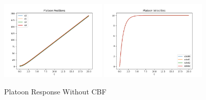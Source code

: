 \begin{figure}[H]
    \centering
    \includegraphics[width=0.45\textwidth]{Figures/Examples/Platoon/NoPositions.png}
    \includegraphics[width=0.45\textwidth]{Figures/Examples/Platoon/NoVelocities.png}
    \caption{Platoon Response Without CBF}
    \label{fig:platoon_no_cbf}
\end{figure}

